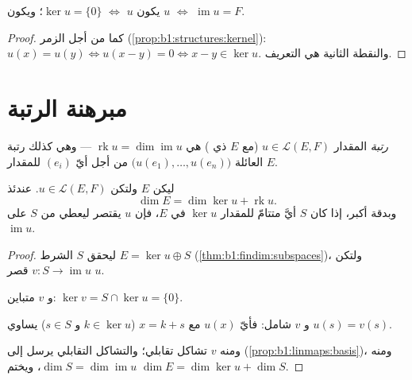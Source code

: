 \begin{proposition}\label{prop:b1:linmaps:kernel}
يكون $u$  $\iff$ $\ker u = \{0\}$؛ ويكون $u$  $\iff$
$\operatorname{im} u = F$.
\end{proposition}

\begin{proof}
كما من أجل الزمر (\cref{prop:b1:structures:kernel}): $u(x) = u(y) \iff
u(x - y) = 0 \iff x - y \in \ker u$. والنقطة الثانية هي
التعريف.
\end{proof}

\section{مبرهنة الرتبة}

\begin{definition}\label{def:b1:linmaps:rank}
\emph{رتبة} المقدار $u \in \mathcal{L}(E,
F)$ (مع $E$ ذي ) هي $\operatorname{rk} u = \dim
\operatorname{im} u$ --- وهي كذلك رتبة العائلة
$\bigl(u(e_1), \dots, u(e_n)\bigr)$ من أجل أيّ  $(e_i)$ للمقدار $E$.
\end{definition}

\begin{theorem}\label{thm:b1:linmaps:ranknullity}
ليكن $E$  ولتكن $u \in \mathcal{L}(E, F)$.
عندئذ
\[
\dim E = \dim \ker u + \operatorname{rk} u .
\]
وبدقة أكبر، إذا كان $S$ أيَّ  متتامّ للمقدار $\ker u$ في
$E$، فإن $u$ يقتصر ليعطي \emph{ } من $S$ على
$\operatorname{im} u$.
\end{theorem}

\begin{proof}
ليحقق $S$ الشرط $E = \ker u \oplus S$
(\cref{thm:b1:findim:subspaces})، ولتكن $v \colon S \to
\operatorname{im} u$ قصر $u$.

و $v$ متباين: $\ker v = S \cap \ker u = \{0\}$.

و $v$ شامل: فأيّ $u(x)$ مع $x = k + s$ ($k \in \ker u$ و $s
\in S$) يساوي $u(s) = v(s)$.

ومنه  $v$ تشاكل تقابلي؛ والتشاكل التقابلي يرسل  إلى 
(\cref{prop:b1:linmaps:basis})، ومنه $\dim S = \dim\operatorname{im}
u$، ويختم $\dim E = \dim\ker u + \dim S$.
\end{proof}

